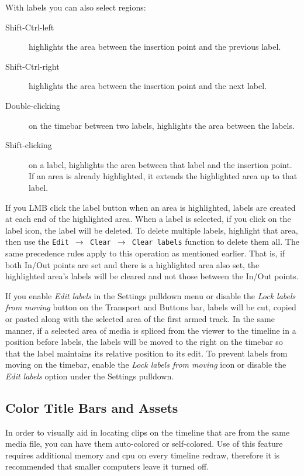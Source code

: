 With labels you can also select regions:

\begin{description}
    \item[Shift-Ctrl-left] highlights the area between the insertion point and the previous label.
    \item[Shift-Ctrl-right] highlights the area between the insertion point and the next label.
    \item[Double-clicking] on the timebar between two labels, highlights the area between the labels.	   
    \item[Shift-clicking] on a label, highlights the area between that label and the insertion point.
        If an area is already highlighted, it extends the highlighted area up to that label.
\end{description}

If you LMB click the label button when an area is highlighted, labels are created at each end of the
highlighted area. 
When a label is selected, if you click on the label icon, the label will be deleted. 
To delete multiple labels, highlight that area, then use the \texttt{Edit $\rightarrow$ Clear $\rightarrow$ Clear labels}
function to delete them all. The same precedence rules apply to this operation as mentioned earlier.  That
is, if both In/Out points are set and there is a highlighted area also set, the highlighted area's 
labels will be cleared and not those between the In/Out points.

If you enable \emph{Edit labels} in the Settings pulldown menu or disable the \emph{Lock labels from moving}
button on the Transport and Buttons bar, labels will be cut, copied or pasted along with the selected
area of the first armed track. 
In the same manner, if a selected area of media is spliced from the viewer to the timeline in a position 
before labels, the labels will be moved to the right on the timebar so that the label maintains its 
relative position to its edit. 
To prevent labels from moving on the timebar, enable the \emph{Lock labels from moving} icon or
disable the \emph{Edit labels} option under the Settings pulldown.

\subsection{Color Title Bars and Assets}%
\label{sub:color_title_bars_and_assets}

In order to visually aid in locating clips on the timeline that are from the same media file, you can have them auto-colored or self-colored.  
Use of this feature requires additional memory and cpu on every timeline redraw, therefore it is recommended that smaller computers leave it turned off.

